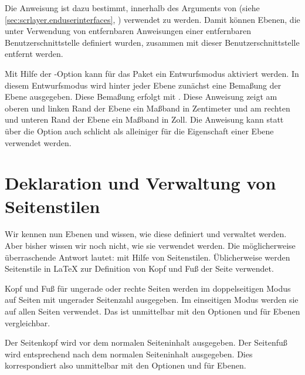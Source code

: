 Die Anweisung ist dazu bestimmt, innerhalb des Arguments  von
 (siehe
\autoref{sec:scrlayer.enduserinterfaces},
) verwendet zu
werden. Damit können Ebenen, die unter Verwendung von entfernbaren Anweisungen
einer entfernbaren Benutzerschnittstelle definiert wurden, zusammen mit dieser
Benutzerschnittstelle entfernt werden.%
\EndIndexGroup


\begin{Declaration}
\end{Declaration}
Mit Hilfe der \KOMAScript-Option
kann für das Paket  ein Entwurfsmodus aktiviert werden. In
diesem Entwurfsmodus wird hinter jeder Ebene zunächst eine Bemaßung der Ebene
ausgegeben. Diese Bemaßung erfolgt mit . Diese
Anweisung zeigt am oberen und linken Rand der Ebene ein Maßband in Zentimeter
und am rechten und unteren Rand der Ebene ein Maßband in Zoll. Die Anweisung
 kann statt über die Option auch schlicht als
alleiniger  für die Eigenschaft  einer Ebene
verwendet werden.%
%
\EndIndexGroup


\section{Deklaration und Verwaltung von Seitenstilen}

\BeginIndexGroup
{}%
Wir kennen nun Ebenen und wissen, wie diese definiert und verwaltet
werden. Aber bisher wissen wir noch nicht, wie sie verwendet werden. Die
möglicherweise überraschende Antwort lautet: mit Hilfe von
Seitenstilen. Üblicherweise werden Seitenstile in \LaTeX{} zur Definition von
Kopf und Fuß der Seite verwendet.

Kopf und Fuß für ungerade oder rechte Seiten werden im doppelseitigen Modus auf Seiten mit ungerader Seitenzahl
ausgegeben. Im einseitigen Modus werden sie auf allen Seiten verwendet. Das
ist unmittelbar mit den
Optionen 
und  für Ebenen vergleichbar.

Der Seitenkopf wird vor dem normalen Seiteninhalt
ausgegeben. Der Seitenfuß wird entsprechend nach dem normalen Seiteninhalt
ausgegeben. Dies korrespondiert also unmittelbar mit den
Optionen
 und  für Ebenen.

